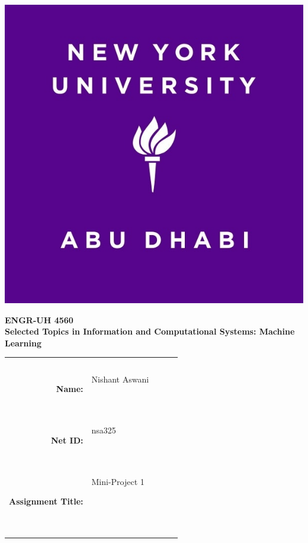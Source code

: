 \documentclass[onecolumn]{article}
\title{\myassignmenttitle}
\author{\myname, \myemail}
\affil{ \myclassname  (\mycoursenumber), Professor \myinstructor}
\date{}
\newcommand{\myname}{Nishant Aswani}
\newcommand{\mynetid}{nsa325}
\newcommand{\myhwtype}{Mini-Project }
\newcommand{\myhwnum}{1}
\newcommand{\mycoursenumber}{ENGR-UH 4560}
\newcommand{\myclassname}{Selected	Topics	in	Information	
and	Computational Systems: Machine Learning}
\begin{document}
\onecolumn
\pagestyle{fancy}
\fancyhf{}
\renewcommand{\headrulewidth}{0pt}
\onecolumn


\begin{center}
  \includegraphics[scale=0.20]{etc/NYUAD-alt-logo.jpg}
\end{center}

{\vspace{2.5em}}

\begin{center}
    \Huge{\textbf{\mycoursenumber}}\\
    {\vspace{0.5em}}
    \Huge{\textbf{\myclassname}}
\end{center}

{\vspace{5em}}

\begin{center}
  \begin{tabular}{|rp{5.0cm}lll|}
    \hline
    &  &  &  & \\
    &  &  &  & \\
    \Large{\textbf{Name:}} & \Large{\myname}
    
    \  &  &  & \\
    \Large{\textbf{Net ID:}} & \Large{\mynetid}
    
    \  &  &  & \\
    \Large{\textbf{Assignment Title:}} & \Large{\myhwtype \myhwnum}
    
    \
    
    \  &  &  & \\
    \hline
  \end{tabular}
\end{center}
\end{document}
